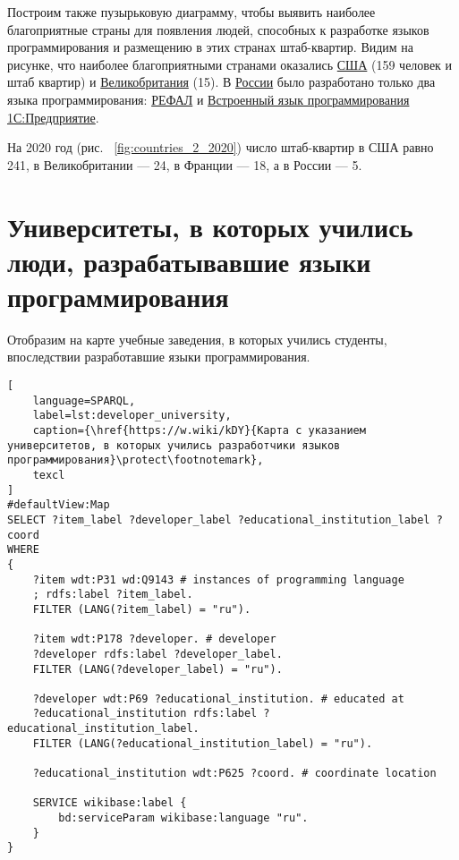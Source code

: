 Построим также пузырьковую диаграмму, чтобы выявить наиболее благоприятные страны для появления людей, способных к разработке языков программирования и размещению в этих странах штаб-квартир. Видим на рисунке, что наиболее благоприятными странами оказались \href{https://en.wikipedia.org/wiki/USA}{США} (159 человек и штаб квартир) и \href{https://ru.wikipedia.org/wiki/Великобритания}{Великобритания} (15). В \href{https://en.wikipedia.org/wiki/Russia}{России} было разработано только два языка программирования: \href{https://www.wikidata.org/wiki/Q2626418}{РЕФАЛ} и \href{https://www.wikidata.org/wiki/Q65065977}{Встроенный язык программирования 1С:Предприятие}.

На 2020 год (рис. ~\ref{fig:countries_2_2020}) число штаб-квартир в США равно 241, в Великобритании — 24, в Франции — 18, а в России — 5.

\section{Университеты, в которых учились люди, разрабатывавшие языки программирования}
Отобразим на карте учебные заведения, в которых учились студенты, впоследствии разработавшие языки программирования.

\begin{lstlisting}[
	language=SPARQL,
	label=lst:developer_university,
	caption={\href{https://w.wiki/kDY}{Карта с указанием университетов, в которых учились разработчики языков программирования}\protect\footnotemark},
	texcl
]
#defaultView:Map
SELECT ?item_label ?developer_label ?educational_institution_label ?coord
WHERE
{
    ?item wdt:P31 wd:Q9143 # instances of programming language
    ; rdfs:label ?item_label. 
    FILTER (LANG(?item_label) = "ru"). 
    
    ?item wdt:P178 ?developer. # developer
    ?developer rdfs:label ?developer_label. 
    FILTER (LANG(?developer_label) = "ru"). 
    	
    ?developer wdt:P69 ?educational_institution. # educated at
    ?educational_institution rdfs:label ?educational_institution_label. 
    FILTER (LANG(?educational_institution_label) = "ru").
    
    ?educational_institution wdt:P625 ?coord. # coordinate location
    
    SERVICE wikibase:label {
        bd:serviceParam wikibase:language "ru".
    } 	
}
\end{lstlisting}

